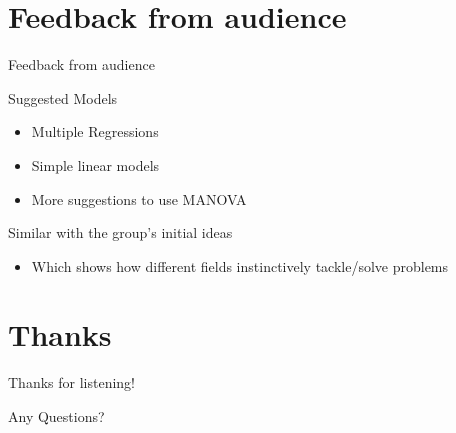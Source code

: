 \documentclass[t, aspectratio=169]{beamer}
\begin{document}
\section{Feedback from audience}
\label{sec:org404d02f}
\begin{frame}[label={sec:orgdc071f0}]{Feedback from audience}
\begin{block}{Suggested Models}
\begin{itemize}
\item Multiple Regressions
\item Simple linear models
\item More suggestions to use MANOVA
\end{itemize}
\end{block}
\begin{block}{Similar with the group's initial ideas}
\begin{itemize}
\item Which shows how different fields instinctively tackle/solve problems
\end{itemize}
\end{block}
\end{frame}


\section{Thanks}
\label{sec:orgd0b5464}

\begin{frame}[label={sec:orgc08eeca}]{Thanks for listening!}
\begin{block}{Any Questions?}
\end{block}
\end{frame}
\end{document}
